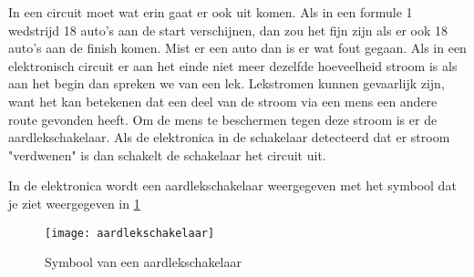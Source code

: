 In een circuit moet wat erin gaat er ook uit komen. Als in een formule 1 wedstrijd 18 auto's aan de start verschijnen, dan zou het fijn zijn als er ook 18 auto's aan de finish komen. Mist er een auto dan is er wat fout gegaan. Als in een elektronisch circuit er aan het einde niet meer dezelfde hoeveelheid stroom is als aan het begin dan spreken we van een lek. Lekstromen kunnen gevaarlijk zijn, want het kan betekenen dat een deel van de stroom via een mens een andere route gevonden heeft. Om de mens te beschermen tegen deze stroom is er de aardlekschakelaar. Als de elektronica in de schakelaar detecteerd dat er stroom "verdwenen" is dan schakelt de schakelaar het circuit uit.

In de elektronica wordt een aardlekschakelaar weergegeven met het symbool dat je ziet weergegeven in \ref{symbool:aardlekschakelaar}

\begin{figure}[h]
\texttt{[image: aardlekschakelaar]}
\centering
\caption{Symbool van een aardlekschakelaar}
\label{symbool:aardlekschakelaar}
\end{figure}

